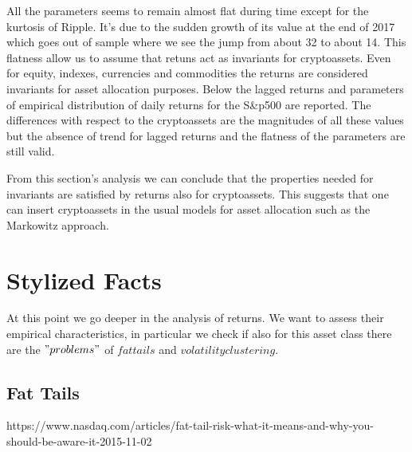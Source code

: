 All the parameters seems to remain almost flat during time except for the kurtosis of Ripple. It's due to the sudden growth of its value at the end of 2017 which goes out of sample where we see the jump from about 32 to about 14.
This flatness allow us to assume that retuns act as invariants for cryptoassets. Even for equity, indexes, currencies and commodities the returns are considered invariants for asset allocation purposes. Below the lagged returns and parameters of empirical distribution of daily returns for the S\&p500 are reported. The differences with respect to the cryptoassets are the magnitudes of all these values but the absence of trend for lagged returns and the flatness of the parameters are still valid.

\begin{table}[H]
    \centering
    \label{tab:my_label}
\end{table}
\bigskip



From this section's analysis we can conclude that the properties needed for invariants are satisfied by returns also for cryptoassets. This suggests that one can insert cryptoassets in the usual models for asset allocation such as the Markowitz approach.

\section{Stylized Facts}
At this point we go deeper in the analysis of returns. We want to assess their empirical characteristics, in particular we check if also for this asset class there are the $"problems"$ of $fat tails$ and $volatility clustering$.

\subsection{Fat Tails}
https://www.nasdaq.com/articles/fat-tail-risk-what-it-means-and-why-you-should-be-aware-it-2015-11-02

